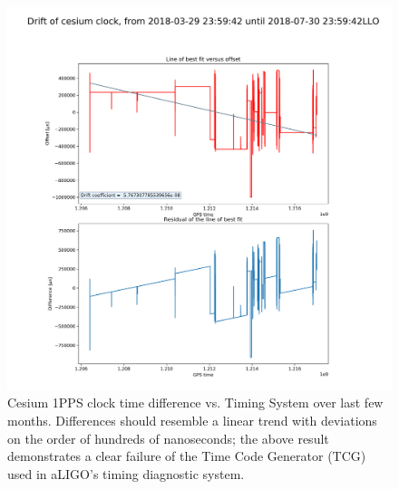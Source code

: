 \documentclass{article}
\begin{document}
\begin{figure}
  \includegraphics[width=\linewidth]{img/cesium-clock.png}
  \caption{Cesium 1PPS clock time difference vs. Timing System over last few months. Differences should resemble a linear trend with deviations on the order of hundreds of nanoseconds; the above result demonstrates a clear failure of the Time Code Generator (TCG) used in aLIGO's timing diagnostic system.}
  \label{fig:cesium}
\end{figure}
\clearpage
\end{document}
